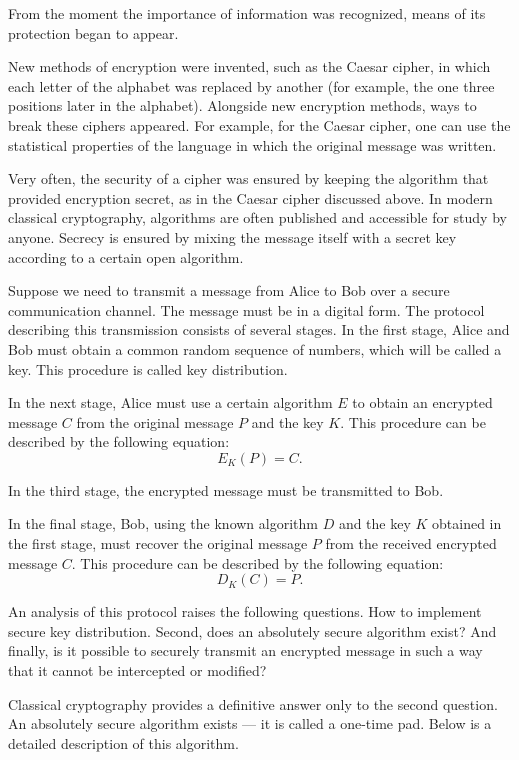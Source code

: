 From the moment the importance of information was recognized, means of its protection began to appear. 

New methods of encryption were invented, such as the Caesar cipher, in which each letter of the alphabet was replaced by another (for example, the one three positions later in the alphabet). Alongside new encryption methods, ways to break these ciphers appeared. For example, for the Caesar cipher, one can use the statistical properties of the language in which the original message was written.

Very often, the security of a cipher was ensured by keeping the algorithm that provided encryption secret, as in the Caesar cipher discussed above. In modern classical cryptography, algorithms are often published and accessible for study by anyone. Secrecy is ensured by mixing the message itself with a secret key according to a certain open algorithm.

Suppose we need to transmit a message from Alice to Bob over a secure communication channel. The message must be in a digital form. The protocol describing this transmission consists of several stages. In the first stage, Alice and Bob must obtain a common random sequence of numbers, which will be called a key. This procedure is called key distribution.

In the next stage, Alice must use a certain algorithm $E$ to obtain an encrypted message $C$ from the original message $P$ and the key $K$. This procedure can be described by the following equation:
\begin{equation}
E_{K}\left(P\right) = C.
\label{eqPart3CryptoEncryptClass}
\end{equation}

In the third stage, the encrypted message must be transmitted to Bob.

In the final stage, Bob, using the known algorithm $D$ and the key $K$ obtained in the first stage, must recover the original message $P$ from the received encrypted message $C$. This procedure can be described by the following equation:
\begin{equation}
D_{K}\left(C\right) = P.
\label{eqPart3CryptoDeEncryptClass}
\end{equation}

An analysis of this protocol raises the following questions. How to implement secure key distribution. Second, does an absolutely secure algorithm exist? And finally, is it possible to securely transmit an encrypted message in such a way that it cannot be intercepted or modified?

Classical cryptography provides a definitive answer only to the second question. An absolutely secure algorithm exists — it is called a one-time pad. Below is a detailed description of this algorithm.